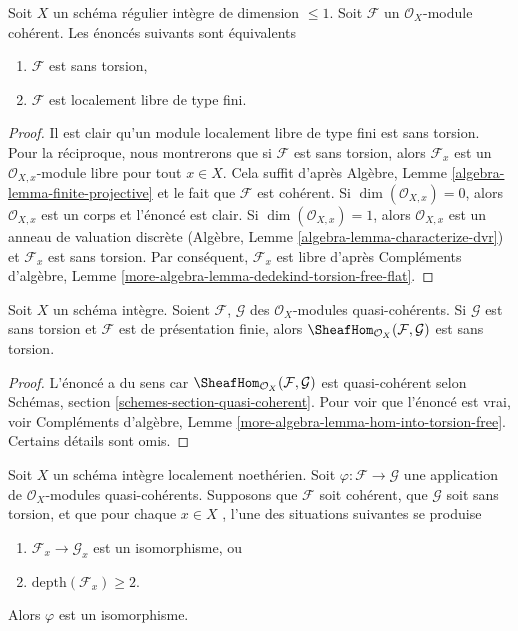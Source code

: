 \begin{lemma}
\label{lemma-torsion-free-over-regular-dim-1}
Soit  $X$  un schéma régulier intègre de dimension  $\leq 1$. Soit
 $\mathcal{F}$  un  $\mathcal{O}_X$-module cohérent. Les énoncés suivants sont
équivalents
\begin{enumerate}
\item $\mathcal{F}$  est sans torsion,
\item $\mathcal{F}$  est localement libre de type fini.
\end{enumerate}
\end{lemma}

\begin{proof}
Il est clair qu'un module localement libre de type fini est sans torsion. Pour la
réciproque, nous montrerons que si  $\mathcal{F}$  est sans torsion, alors
 $\mathcal{F}_x$  est un  $\mathcal{O}_{X, x}$-module libre pour tout  $x \in X$. Cela suffit
d'après Algèbre, Lemme  \ref{algebra-lemma-finite-projective}  et le fait que  $\mathcal{F}$  est cohérent. Si
 $\dim(\mathcal{O}_{X, x}) = 0$, alors  $\mathcal{O}_{X, x}$  est un corps et l'énoncé est clair. Si
 $\dim(\mathcal{O}_{X, x}) = 1$, alors  $\mathcal{O}_{X, x}$  est un anneau de valuation discrète (Algèbre,
Lemme  \ref{algebra-lemma-characterize-dvr}) et  $\mathcal{F}_x$  est sans torsion. Par conséquent,  $\mathcal{F}_x$ 
est libre d'après Compléments d'algèbre, Lemme  \ref{more-algebra-lemma-dedekind-torsion-free-flat}.
\end{proof}

\begin{lemma}
\label{lemma-hom-into-torsion-free}
Soit  $X$  un schéma intègre. Soient  $\mathcal{F}$,  $\mathcal{G}$  des
 $\mathcal{O}_X$-modules quasi-cohérents. Si  $\mathcal{G}$  est sans torsion et
 $\mathcal{F}$  est de présentation finie, alors  $\SheafHom_{\mathcal{O}_X}(\mathcal{F}, \mathcal{G})$  est sans torsion.
\end{lemma}

\begin{proof}
L'énoncé a du sens car  $\SheafHom_{\mathcal{O}_X}(\mathcal{F}, \mathcal{G})$  est quasi-cohérent selon Schémas, section
 \ref{schemes-section-quasi-coherent}. Pour voir que l'énoncé est vrai, voir Compléments d'algèbre, Lemme
 \ref{more-algebra-lemma-hom-into-torsion-free}. Certains détails sont omis.
\end{proof}

\begin{lemma}
\label{lemma-isom-depth-2-torsion-free}
Soit  $X$  un schéma intègre localement noethérien. Soit  $\varphi : \mathcal{F} \to \mathcal{G}$  une
application de  $\mathcal{O}_X$-modules quasi-cohérents. Supposons que  $\mathcal{F}$ 
soit cohérent, que  $\mathcal{G}$  soit sans torsion, et que pour chaque
 $x \in X$ , l'une des situations suivantes se produise
\begin{enumerate}
\item $\mathcal{F}_x \to \mathcal{G}_x$  est un isomorphisme, ou
\item $\text{depth}(\mathcal{F}_x) \geq 2$.
\end{enumerate}
Alors  $\varphi$  est un isomorphisme.
\end{lemma}

